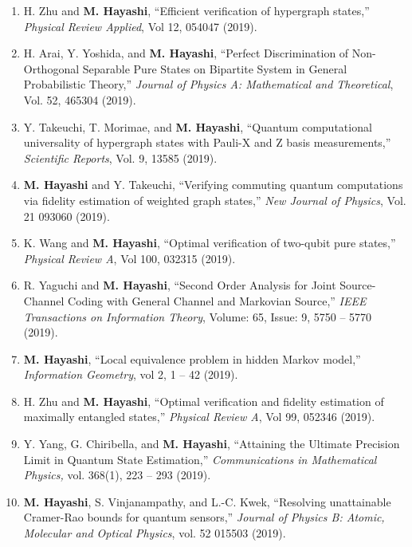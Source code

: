 \documentclass[a4paper,12pt,oneside]{article}
\begin{document}
\begin{enumerate}
\item 
H. Zhu and \textbf{M. Hayashi},
``Efficient verification of hypergraph states,''
{\em Physical Review Applied}, 
Vol 12, 054047 (2019).

\item 
H. Arai, Y. Yoshida, and \textbf{M. Hayashi},
``Perfect Discrimination of Non-Orthogonal Separable Pure States on Bipartite System in General Probabilistic Theory,''
{\em Journal of Physics A: Mathematical and Theoretical}, 
Vol. 52, 465304 (2019).

\item 
Y. Takeuchi, T. Morimae, and \textbf{M. Hayashi},
``Quantum computational
universality of hypergraph states with Pauli-X and Z basis measurements,''
{\em Scientific Reports}, Vol. 9, 13585 (2019).

\item 
\textbf{M. Hayashi} and Y. Takeuchi, 
``Verifying commuting quantum computations via fidelity estimation of weighted graph states,''
{\em New Journal of Physics}, Vol. 21 093060 (2019).

\item 
K. Wang and \textbf{M. Hayashi},
``Optimal verification of two-qubit pure states,''
{\em Physical Review A}, 
Vol 100, 032315 (2019).

\item 
R. Yaguchi and \textbf{M. Hayashi}, 
``Second Order Analysis for Joint Source-Channel Coding with General Channel and Markovian Source,''
{\em IEEE Transactions on Information Theory}, 
Volume: 65, Issue: 9, 5750 -- 5770 (2019). 

\item 
\textbf{M. Hayashi}, 
``Local equivalence problem in hidden Markov model,''
{\em Information Geometry}, 
vol 2, 1 -- 42 (2019). 

\item 
H. Zhu and \textbf{M. Hayashi}, 
``Optimal verification and fidelity estimation of maximally entangled states,''
{\em Physical Review A}, Vol 99, 052346 (2019).

\item 
Y. Yang, G. Chiribella, and \textbf{M. Hayashi}, 
``Attaining the Ultimate Precision Limit in Quantum State Estimation,''
{\em Communications in Mathematical Physics,}
vol. 368(1), 223 -- 293 (2019). 

\item 
\textbf{M. Hayashi}, S. Vinjanampathy, and L.-C. Kwek, 
``Resolving unattainable Cramer-Rao bounds for quantum sensors,''
{\em Journal of Physics B: Atomic, Molecular and Optical Physics},
vol. 52 015503 (2019). 


\end{enumerate}
\end{document}
